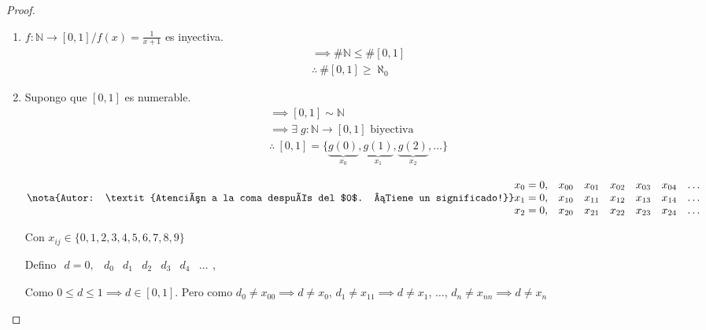 \begin{proof}\phantom{.}

    \begin{enumerate}
        \item $f: \mathbb{N} \to [0,1] / f(x) = \frac{1}{x+1}$ es inyectiva.
            \begin{align*}
                &\implies \# \mathbb{N} \leq \# [0,1] \\
                &\therefore ~ \# [0,1] \geq \aleph_0
            \end{align*}

        \item Supongo que $[0,1]$ es numerable.
            \begin{align*}
                &\implies [0,1] \sim \mathbb{N} \\
                &\implies \exists \; g:\mathbb{N}\to [0,1] \text{ biyectiva}\\
                &\therefore ~ [0,1] = \{ \underbrace{g(0)}_{x_0}, 
                \underbrace{g(1)}_{x_1}, \underbrace{g(2)}_{x_2}, \dotsc \}
            \end{align*}

            \begin{equation*}
                \nota{Autor: \textit{Atención a la coma después del $0$. ¡Tiene un significado!}}
                \begin{matrix}
                    x_0 = 0, & x_{00} & x_{01} & x_{02} & x_{03} & x_{04} 
                            & \dots\\
                    x_1 = 0, & x_{10} & x_{11} & x_{12} & x_{13} & x_{14}
                            & \dots \\
                    x_2 = 0, & x_{20} & x_{21} & x_{22} & x_{23} & x_{24}
                            & \dots \\
                \end{matrix}
            \end{equation*}
            
            Con $x_{ij} \in \{0,1,2,3,4,5,6,7,8,9\}$


            Defino $\begin{matrix} 
                d = 0, & d_0 & d_1 & d_2 & d_3 & d_4 & \dots 
            \end{matrix}$,

            Como $0 \leq d \leq 1 \implies d \in [0,1]$.
            Pero como $d_0 \neq x_{00} \implies d \neq x_0$, 
            $d_1 \neq x_{11} \implies d \neq x_1$, $\dots$,
            $d_n \neq x_{nn} \implies d \neq x_n$


\end{enumerate}
\end{proof}
